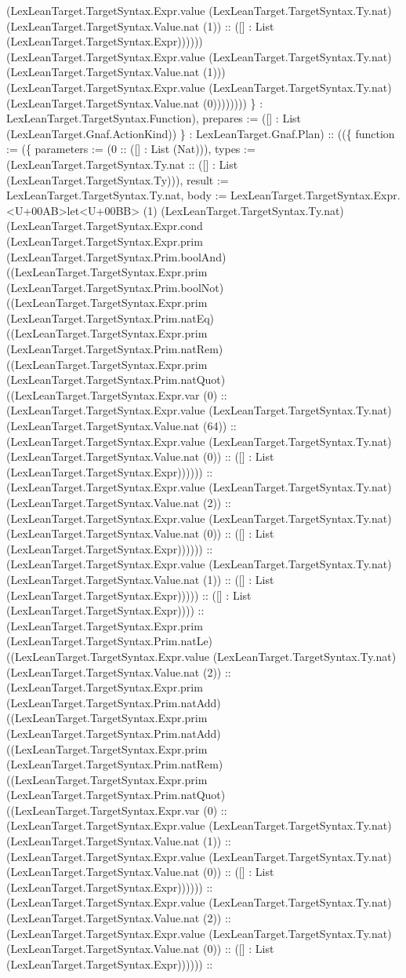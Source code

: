 \documentclass[11pt]{article}
\begin{document}
(LexLeanTarget.TargetSyntax.Expr.value (LexLeanTarget.TargetSyntax.Ty.nat) (LexLeanTarget.TargetSyntax.Value.nat (1)) :: ([] : List (LexLeanTarget.TargetSyntax.Expr)))))) (LexLeanTarget.TargetSyntax.Expr.value (LexLeanTarget.TargetSyntax.Ty.nat) (LexLeanTarget.TargetSyntax.Value.nat (1))) (LexLeanTarget.TargetSyntax.Expr.value (LexLeanTarget.TargetSyntax.Ty.nat) (LexLeanTarget.TargetSyntax.Value.nat (0)))))))) \} : LexLeanTarget.TargetSyntax.Function), prepares := ([] : List (LexLeanTarget.Gnaf.ActionKind)) \} : LexLeanTarget.Gnaf.Plan) :: ((\{ function := (\{ parameters := (0 :: ([] : List (Nat))), types := (LexLeanTarget.TargetSyntax.Ty.nat :: ([] : List (LexLeanTarget.TargetSyntax.Ty))), result := LexLeanTarget.TargetSyntax.Ty.nat, body := LexLeanTarget.TargetSyntax.Expr.<U+00AB>let<U+00BB> (1) (LexLeanTarget.TargetSyntax.Ty.nat) (LexLeanTarget.TargetSyntax.Expr.cond (LexLeanTarget.TargetSyntax.Expr.prim (LexLeanTarget.TargetSyntax.Prim.boolAnd) ((LexLeanTarget.TargetSyntax.Expr.prim (LexLeanTarget.TargetSyntax.Prim.boolNot) ((LexLeanTarget.TargetSyntax.Expr.prim (LexLeanTarget.TargetSyntax.Prim.natEq) ((LexLeanTarget.TargetSyntax.Expr.prim (LexLeanTarget.TargetSyntax.Prim.natRem) ((LexLeanTarget.TargetSyntax.Expr.prim (LexLeanTarget.TargetSyntax.Prim.natQuot) ((LexLeanTarget.TargetSyntax.Expr.var (0) :: (LexLeanTarget.TargetSyntax.Expr.value (LexLeanTarget.TargetSyntax.Ty.nat) (LexLeanTarget.TargetSyntax.Value.nat (64)) :: (LexLeanTarget.TargetSyntax.Expr.value (LexLeanTarget.TargetSyntax.Ty.nat) (LexLeanTarget.TargetSyntax.Value.nat (0)) :: ([] : List (LexLeanTarget.TargetSyntax.Expr)))))) :: (LexLeanTarget.TargetSyntax.Expr.value (LexLeanTarget.TargetSyntax.Ty.nat) (LexLeanTarget.TargetSyntax.Value.nat (2)) :: (LexLeanTarget.TargetSyntax.Expr.value (LexLeanTarget.TargetSyntax.Ty.nat) (LexLeanTarget.TargetSyntax.Value.nat (0)) :: ([] : List (LexLeanTarget.TargetSyntax.Expr)))))) :: (LexLeanTarget.TargetSyntax.Expr.value (LexLeanTarget.TargetSyntax.Ty.nat) (LexLeanTarget.TargetSyntax.Value.nat (1)) :: ([] : List (LexLeanTarget.TargetSyntax.Expr))))) :: ([] : List (LexLeanTarget.TargetSyntax.Expr)))) :: (LexLeanTarget.TargetSyntax.Expr.prim (LexLeanTarget.TargetSyntax.Prim.natLe) ((LexLeanTarget.TargetSyntax.Expr.value (LexLeanTarget.TargetSyntax.Ty.nat) (LexLeanTarget.TargetSyntax.Value.nat (2)) :: (LexLeanTarget.TargetSyntax.Expr.prim (LexLeanTarget.TargetSyntax.Prim.natAdd) ((LexLeanTarget.TargetSyntax.Expr.prim (LexLeanTarget.TargetSyntax.Prim.natAdd) ((LexLeanTarget.TargetSyntax.Expr.prim (LexLeanTarget.TargetSyntax.Prim.natRem) ((LexLeanTarget.TargetSyntax.Expr.prim (LexLeanTarget.TargetSyntax.Prim.natQuot) ((LexLeanTarget.TargetSyntax.Expr.var (0) :: (LexLeanTarget.TargetSyntax.Expr.value (LexLeanTarget.TargetSyntax.Ty.nat) (LexLeanTarget.TargetSyntax.Value.nat (1)) :: (LexLeanTarget.TargetSyntax.Expr.value (LexLeanTarget.TargetSyntax.Ty.nat) (LexLeanTarget.TargetSyntax.Value.nat (0)) :: ([] : List (LexLeanTarget.TargetSyntax.Expr)))))) :: (LexLeanTarget.TargetSyntax.Expr.value (LexLeanTarget.TargetSyntax.Ty.nat) (LexLeanTarget.TargetSyntax.Value.nat (2)) :: (LexLeanTarget.TargetSyntax.Expr.value (LexLeanTarget.TargetSyntax.Ty.nat) (LexLeanTarget.TargetSyntax.Value.nat (0)) :: ([] : List (LexLeanTarget.TargetSyntax.Expr)))))) :: 
\end{document}
